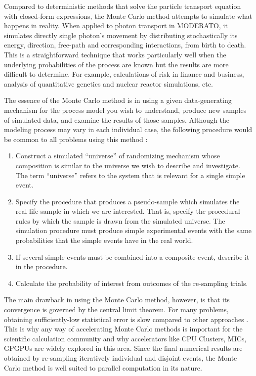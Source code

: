 Compared to deterministic methods that solve the particle transport equation with closed-form expressions, the Monte Carlo method attempts to simulate what happens in reality. When applied to photon transport in MODERATO, it simulates directly single photon's movement by distributing stochastically its energy, direction, free-path and corresponding interactions, from birth to death. This is a straightforward technique that works particularly well when the underlying probabilities of the process are known but the results are more difficult to determine. For example, calculations of risk in finance and business, analysis of quantitative genetics and nuclear reactor simulations, etc.

The essence of the Monte Carlo method is in using a given data-generating mechanism for the process model you wish to understand, produce new samples of simulated data, and examine the results of those samples. Although the modeling process may vary in each individual case, the following procedure would be common to all problems using this method \citep{montecarlo}:
\begin{enumerate}
\it
\item Construct a simulated “universe” of randomizing mechanism whose composition is similar to the universe we wish to describe and investigate. The term “universe” refers to the system that is relevant for a single simple event.
\item Specify the procedure that produces a pseudo-sample which simulates the real-life sample in which we are interested. That is, specify the procedural rules by which the sample is drawn from the simulated universe. The simulation procedure must produce simple experimental events with the same probabilities that the simple events have in the real world.
\item If several simple events must be combined into a composite event, describe it in the procedure.
\item Calculate the probability of interest from outcomes of the re-sampling trials.
\end{enumerate}
The main drawback in using the Monte Carlo method, however, is that its convergence is governed by the central limit theorem. For many problems, obtaining sufficiently-low statistical error is slow compared to other approaches \citep{Reference2}. This is why any way of accelerating Monte Carlo methods is important for the scientific calculation community and why accelerators like CPU Clusters, MICs, GPGPUs are widely explored in this area. Since the final numerical results are obtained by re-sampling iteratively individual and disjoint events, the Monte Carlo method is well suited to parallel computation in its nature.

